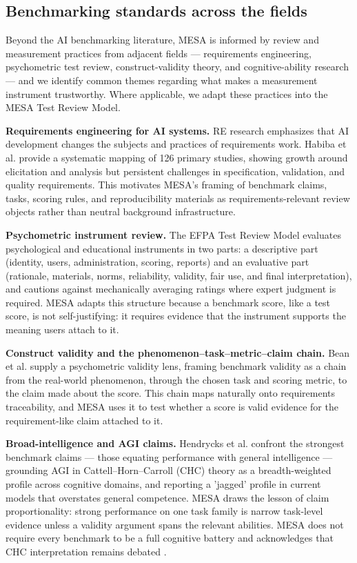 \documentclass[conference]{IEEEtran}
\begin{document}
    \subsection{Benchmarking standards across the fields}
    
        Beyond the AI benchmarking literature, MESA is informed by review and measurement practices from adjacent fields --- requirements engineering, psychometric test review, construct-validity theory, and cognitive-ability research --- and we identify common themes regarding what makes a measurement instrument trustworthy. Where applicable, we adapt these practices into the MESA Test Review Model.
        
        \textbf{Requirements engineering for AI systems.} RE research emphasizes that AI development changes the subjects and practices of requirements work. Habiba et al. \cite{habiba_re4ai_maturity_2024} provide a systematic mapping of 126 primary studies, showing growth around elicitation and analysis but persistent challenges in specification, validation, and quality requirements. This motivates MESA's framing of benchmark claims, tasks, scoring rules, and reproducibility materials as requirements-relevant review objects rather than neutral background infrastructure.
        
        \textbf{Psychometric instrument review.} The EFPA Test Review Model \cite{efpa_test_review_model_2025} evaluates psychological and educational instruments in two parts: a descriptive part (identity, users, administration, scoring, reports) and an evaluative part (rationale, materials, norms, reliability, validity, fair use, and final interpretation), and cautions against mechanically averaging ratings where expert judgment is required. MESA adapts this structure because a benchmark score, like a test score, is not self-justifying: it requires evidence that the instrument supports the meaning users attach to it.
        
        \textbf{Construct validity and the phenomenon--task--metric--claim chain.} Bean et al. \cite{bean_measuring_what_matters} supply a psychometric validity lens, framing benchmark validity as a chain from the real-world phenomenon, through the chosen task and scoring metric, to the claim made about the score. This chain maps naturally onto requirements traceability, and MESA uses it to test whether a score is valid evidence for the requirement-like claim attached to it.
        
        \textbf{Broad-intelligence and AGI claims.} Hendrycks et al. \cite{hendrycks_definition_agi} confront the strongest benchmark claims --- those equating performance with general intelligence --- grounding AGI in Cattell--Horn--Carroll (CHC) theory as a breadth-weighted profile across cognitive domains, and reporting a 'jagged' profile in current models that overstates general competence. MESA draws the lesson of claim proportionality: strong performance on one task family is narrow task-level evidence unless a validity argument spans the relevant abilities. MESA does not require every benchmark to be a full cognitive battery and acknowledges that CHC interpretation remains debated \cite{canivez_chc_critique}.
\end{document}
